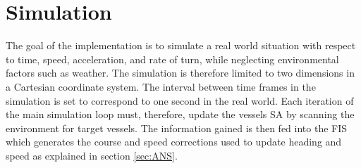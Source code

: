 \section{Simulation}
The goal of the implementation is to  simulate a real world situation with respect to time, speed, acceleration, and rate of turn, while neglecting  environmental factors such as weather.
The simulation is therefore limited to two dimensions in a Cartesian coordinate system.
The interval between time frames in the simulation is set to correspond to one second in the real world.
Each iteration of the main simulation loop must, therefore, update the vessels SA by scanning the environment for target vessels. The information gained is then fed into the FIS which generates the course and speed corrections used to update heading and speed as explained in section \ref{sec:ANS}.
